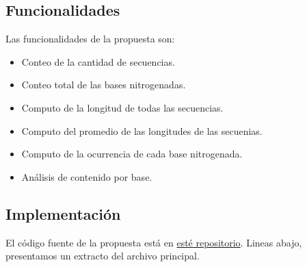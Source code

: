 \subsection{Funcionalidades}

Las funcionalidades de la propuesta son:
\begin{itemize}
	\item Conteo de la cantidad de secuencias. 
	\item Conteo total de las bases nitrogenadas. 
	\item Computo de la longitud de todas las secuencias. 
	\item Computo del promedio de las longitudes de las secuenias.
	\item Computo de la ocurrencia de cada base nitrogenada.
	\item Análisis de contenido por base.
\end{itemize}

\subsection{Implementación}

El código fuente de la propuesta está en \href{La implementación esta en un  repositorio de Github }{esté repositorio}. Lineas abajo, presentamos un extracto del archivo principal. \\

